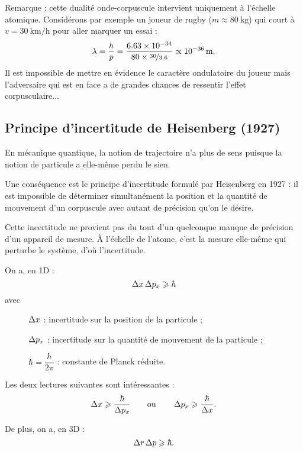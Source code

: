 Remarque : cette dualité onde-corpuscule intervient uniquement à l'échelle atomique. Considérons par exemple un joueur de rugby (\(m\approx\SI{80}{\kilo\gram}\)) qui court à \(v=\SI{30}{\kilo\meter\per\hour}\) pour aller marquer un essai : \[\lambda=\dfrac{h}{p}=\dfrac{\num{6.63e-34}}{\num{80}\times\nicefrac{\num{30}}{\num{3.6}}}\propto\SI{e-36}{\meter}.\] Il est impossible de mettre en évidence le caractère ondulatoire du joueur mais l'adversaire qui est en face a de grandes chances de ressentir l'effet corpusculaire...

\subsection{Principe d'incertitude de Heisenberg (1927)}

En mécanique quantique, la notion de trajectoire n'a plus de sens puisque la notion de particule a elle-même perdu le sien.

Une conséquence est le principe d'incertitude formulé par Heisenberg en 1927 : il est impossible de déterminer simultanément la position et la quantité de mouvement d'un corpuscule avec autant de précision qu'on le désire.

Cette incertitude ne provient pas du tout d'un quelconque manque de précision d'un appareil de mesure. À l'échelle de l'atome, c'est la mesure elle-même qui perturbe le système, d'où l'incertitude.

On a, en 1D : \[\adif{x}\adif{p_x}\geq\hbar\] avec \begin{description}
    \item[] \(\adif{x}\) : incertitude sur la position de la particule ;
    \item[] \(\adif{p_x}\) : incertitude sur la quantité de mouvement de la particule ;
    \item[] \(\hbar=\dfrac{h}{2\pi}\) : constante de Planck réduite. \\
\end{description}

Les deux lectures suivantes sont intéressantes : \[\adif{x}\geq\dfrac{\hbar}{\adif{p_x}}\qquad\text{ou}\qquad\adif{p_x}\geq\dfrac{\hbar}{\adif{x}}.\]

De plus, on a, en 3D : \[\adif{r}\adif{p}\geq\hbar.\]